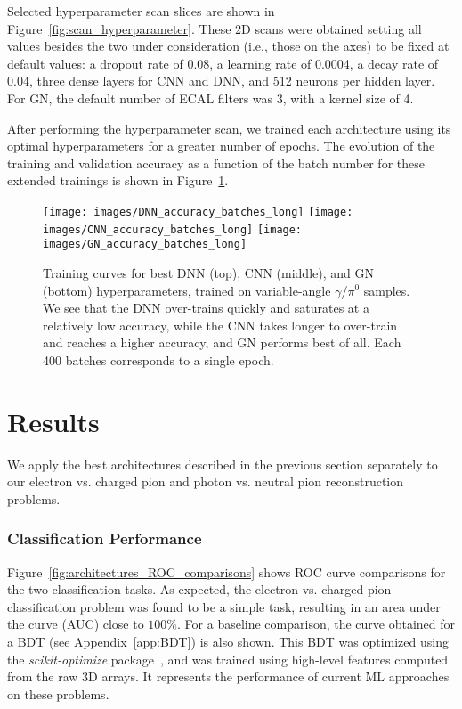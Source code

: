 Selected hyperparameter scan slices are shown in Figure~\ref{fig:scan_hyperparameter}. 
These 2D scans were obtained setting all values besides the two under consideration (i.e., those on the axes) to be fixed at default values: a dropout rate of 0.08, a learning rate of 0.0004, a decay rate of 0.04, three dense layers for CNN and DNN, and 512 neurons per hidden layer. For GN, the default number of ECAL filters was 3, with a kernel size of 4.

After performing the hyperparameter scan, we trained each architecture using its optimal hyperparameters for a greater number of epochs. The evolution of the training and validation accuracy as a function of the batch number for these extended trainings is shown in Figure~\ref{fig:training_curves_comparison_gamma_pi0}.

\begin{figure}[htbp]
\centering
\texttt{[image: images/DNN\_accuracy\_batches\_long]}
\texttt{[image: images/CNN\_accuracy\_batches\_long]}
\texttt{[image: images/GN\_accuracy\_batches\_long]}
\caption{Training curves for best DNN (top), CNN (middle), and GN (bottom) hyperparameters, trained on variable-angle $\gamma$/$\pi^0$ samples. We see that the DNN over-trains quickly and saturates at a relatively low accuracy, while the CNN takes longer to over-train and reaches a higher accuracy, and GN performs best of all. Each 400 batches corresponds to a single epoch.}
\label{fig:training_curves_comparison_gamma_pi0}
\end{figure}

\chapter{Results}

We apply the best architectures described in the previous section separately to our electron vs. charged pion and photon vs. neutral pion reconstruction problems.

\subsection{Classification Performance}
\label{sec:classification}

Figure~\ref{fig:architectures_ROC_comparisons} shows ROC curve comparisons for the two classification tasks. As expected, the electron vs. charged pion classification problem was found to be a simple task, resulting in an area under the curve (AUC) close to $100\%$. For a baseline comparison, the curve obtained for a BDT (see Appendix~\ref{app:BDT}) is also shown. This BDT was optimized using the {\it scikit-optimize} package~\cite{skopt}, and was trained using high-level features computed from the raw 3D arrays. It represents the performance of current ML approaches on these problems.

